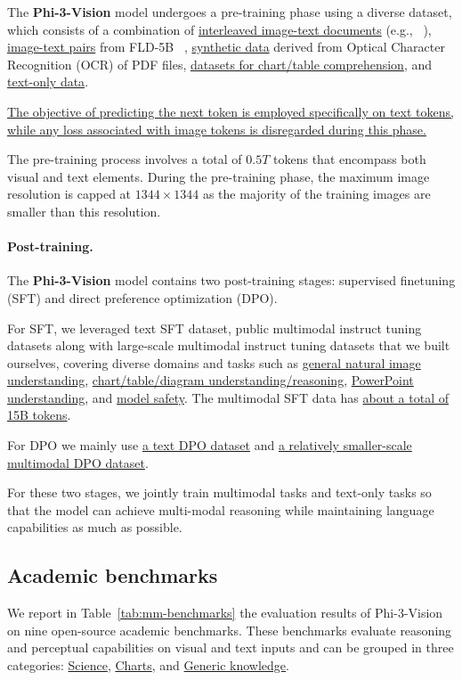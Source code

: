 \documentclass[11pt]{article}
\newcommand{\phivision}{Phi-3-Vision\xspace}
\begin{document}
The \textbf{\phivision} model undergoes a pre-training phase using a diverse dataset, which consists of a combination of \uline{interleaved image-text documents} ({e.g.}, ~\cite{laurenccon2024obelics}), \uline{image-text pairs} from FLD-5B ~\cite{xiao2023florence}, \uline{synthetic data} derived from Optical Character Recognition (OCR) of PDF files, \uline{datasets for chart/table comprehension}, and \uline{text-only data}.

\uline{The objective of predicting the next token is employed specifically on text tokens, while any loss associated with image tokens is disregarded during this phase.}

The pre-training process involves a total of $0.5T$ tokens that encompass both visual and text elements. During the pre-training phase, the maximum image resolution is capped at $1344 \times 1344$ as the majority of the training images are smaller than this resolution.

\paragraph{Post-training.} 

The \textbf{\phivision} model contains two post-training stages: supervised finetuning (SFT) and direct preference optimization (DPO).

For SFT, we leveraged text SFT dataset, public multimodal instruct tuning datasets along with large-scale multimodal instruct tuning datasets that we built ourselves, covering diverse domains and tasks such as \uline{general natural image understanding}, \uline{chart/table/diagram understanding/reasoning}, \uline{PowerPoint understanding}, and \uline{model safety}. The multimodal SFT data has \uline{about a total of 15B tokens}.

For DPO we mainly use \uline{a text DPO dataset} and \uline{a relatively smaller-scale multimodal DPO dataset}.

For these two stages, we jointly train multimodal tasks and text-only tasks so that the model can achieve multi-modal reasoning while maintaining language capabilities as much as possible. 

\subsection{Academic benchmarks}

We report in Table~\ref{tab:mm-benchmarks} the evaluation results of Phi-3-Vision on nine open-source academic benchmarks. These benchmarks evaluate reasoning and perceptual capabilities on visual and text inputs and can be grouped in three categories: \uline{Science}, \uline{Charts}, and \uline{Generic knowledge}.
\end{document}
